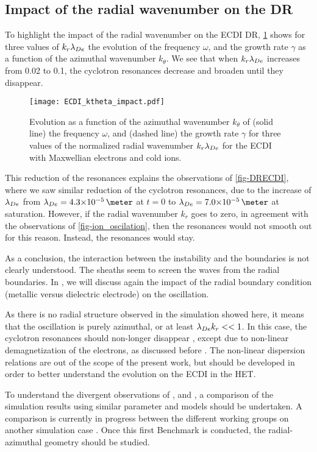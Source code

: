   \subsection{Impact of the radial wavenumber on the \acs{DR}}
   \label{subsec-kr}

  To highlight the impact of the radial wavenumber on the \ac{ECDI} \ac{DR}, \cref{fig-kreffect} shows for three values of $k_r \lambda_{De}$ the evolution of the frequency $\omega$, and  the growth rate $\gamma$ as a function of the azimuthal wavenumber $k_{\theta}$.
  We see that when $k_r \lambda_{De}$ increases from 0.02 to 0.1, the cyclotron resonances decrease and broaden until they disappear.
  \begin{figure}[!hbt]
    \centering
    \texttt{[image: ECDI\_ktheta\_impact.pdf]}
    \caption{Evolution as a function of the azimuthal wavenumber $k_{\theta}$ of (solid line) the frequency $\omega$, and (dashed line) the growth rate $\gamma$ for three values of the normalized radial wavenumber $k_r \lambda_{De}$ for the \acs{ECDI} with Maxwellian electrons and cold ions. }
    \label{fig-kreffect}
  \end{figure}
  
  This reduction of the resonances explains the observations of \cref{fig-DRECDI}, where we saw similar reduction of the cyclotron resonances, due to the increase of $\lambda_{De}$ from $\lde=\sn{4.3}{-5}\,\meter$ at $t=0$ to $\lde=\sn{7.0}{-5}\,\meter$ at saturation.
  However, if the radial wavenumber $k_r$ goes to zero, in agreement with the observations of \cref{fig-ion_oscilation}, then the resonances would not smooth out for this reason.
  Instead, the resonances would stay.
  
  \vspace{1em}
  As a conclusion, the interaction between the instability and the boundaries is not clearly understood.
  The sheaths seem to  screen the waves from the radial boundaries.
  In , we will discuss again the impact of the radial boundary condition (metallic versus dielectric electrode) on the oscillation.

  As there is no radial structure observed in the simulation showed here, it means that the oscillation is purely azimuthal, or at least $\lambda_{De} k_r <<1$.
  In this case, the cyclotron resonances should non-longer disappear \citep{ducrocq2006}, except due to non-linear demagnetization of the electrons, as discussed before \citep{boeuf2018,taccogna2019}.
  The non-linear dispersion relations are out of the scope of the present work, but should be developed in order to better understand the evolution on the \ac{ECDI} in the \ac{HET}.
  
  To understand the divergent observations of \citet{hara2019a,janhunen2018}, and \citet{taccogna2019}, a comparison of the simulation results using similar parameter and models should be undertaken.
  A comparison is currently in progress between the different working groups on another simulation case \citep{charoy2019}. 
  Once this first Benchmark is conducted, the radial-azimuthal geometry should be studied.
  
  
  
  